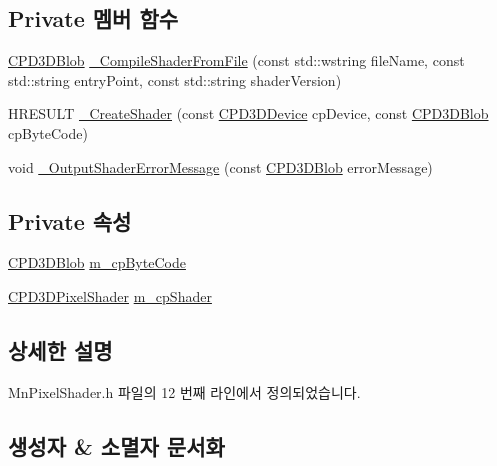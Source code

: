 \subsection*{Private 멤버 함수}
\begin{DoxyCompactItemize}
\item 
\hyperlink{namespace_m_n_l_a3716e3bee60c31fe1b7b5dd5a82db59a}{C\+P\+D3\+D\+Blob} \hyperlink{class_m_n_l_1_1_mn_pixel_shader_a66c1b5bfd8873fefe111e74609066b4c}{\+\_\+\+Compile\+Shader\+From\+File} (const std\+::wstring file\+Name, const std\+::string entry\+Point, const std\+::string shader\+Version)
\item 
H\+R\+E\+S\+U\+LT \hyperlink{class_m_n_l_1_1_mn_pixel_shader_a01cef881b676b0fa699d0cdd0a37b3c9}{\+\_\+\+Create\+Shader} (const \hyperlink{namespace_m_n_l_a1eec210db8f309a4a9ac0d9658784c31}{C\+P\+D3\+D\+Device} cp\+Device, const \hyperlink{namespace_m_n_l_a3716e3bee60c31fe1b7b5dd5a82db59a}{C\+P\+D3\+D\+Blob} cp\+Byte\+Code)
\item 
void \hyperlink{class_m_n_l_1_1_mn_pixel_shader_aa93bd4d048034eefed2b975c6a0bf8eb}{\+\_\+\+Output\+Shader\+Error\+Message} (const \hyperlink{namespace_m_n_l_a3716e3bee60c31fe1b7b5dd5a82db59a}{C\+P\+D3\+D\+Blob} error\+Message)
\end{DoxyCompactItemize}
\subsection*{Private 속성}
\begin{DoxyCompactItemize}
\item 
\hyperlink{namespace_m_n_l_a3716e3bee60c31fe1b7b5dd5a82db59a}{C\+P\+D3\+D\+Blob} \hyperlink{class_m_n_l_1_1_mn_pixel_shader_a427dfc261b2d4ae857025c00063d1e97}{m\+\_\+cp\+Byte\+Code}
\item 
\hyperlink{namespace_m_n_l_a4d6bd408e6e19137a03728583296f12a}{C\+P\+D3\+D\+Pixel\+Shader} \hyperlink{class_m_n_l_1_1_mn_pixel_shader_a93c58b6b8428e3187e9ef53f1c7f3578}{m\+\_\+cp\+Shader}
\end{DoxyCompactItemize}


\subsection{상세한 설명}


Mn\+Pixel\+Shader.\+h 파일의 12 번째 라인에서 정의되었습니다.



\subsection{생성자 \& 소멸자 문서화}
\mbox{\label{class_m_n_l_1_1_mn_pixel_shader_a28326df19b17b959ded2b0be89105fcb}} 
